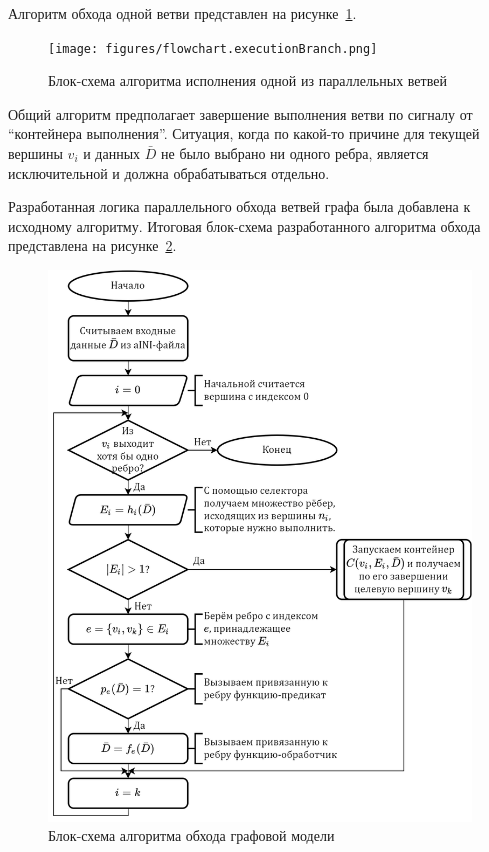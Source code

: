 Алгоритм обхода одной ветви представлен на рисунке~\ref{fig:flowchartExecutionBranch}.

\begin{figure}[!ht]
    \centering
    \texttt{[image: figures/flowchart.executionBranch.png]}
    \caption{Блок-схема алгоритма исполнения одной из параллельных ветвей}
    \label{fig:flowchartExecutionBranch}
\end{figure}

Общий алгоритм предполагает завершение выполнения ветви по сигналу от ``контейнера выполнения''. Ситуация, когда по какой-то причине для текущей вершины $v_i$ и данных $\bar{D}$ не было выбрано ни одного ребра, является исключительной и должна обрабатываться отдельно.

Разработанная логика параллельного обхода ветвей графа была добавлена к исходному алгоритму. Итоговая блок-схема разработанного алгоритма обхода представлена на рисунке~\ref{fig:flowchartFinal}.

\begin{figure}[!ht]
    \centering
    \includegraphics[height=0.6\textheight]{figures/flowchart.graphRunning2.png}
    \caption{Блок-схема алгоритма обхода графовой модели}
    \label{fig:flowchartFinal}
\end{figure}

